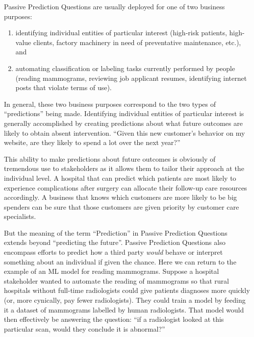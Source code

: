 \documentclass[12pt]{article}
\begin{document}
Passive Prediction Questions are usually deployed for one of two
business purposes:

\begin{enumerate}
\def\labelenumi{\arabic{enumi})}

\item
  identifying individual entities of particular interest (high-risk
  patients, high-value clients, factory machinery in need of
  preventative maintenance, etc.), and
\item
  automating classification or labeling tasks currently performed by
  people (reading mammograms, reviewing job applicant resumes,
  identifying internet posts that violate terms of use).
\end{enumerate}

In general, these two business purposes correspond to the two types of
``predictions'' being made. Identifying individual entities of
particular interest is generally accomplished by creating predictions
about what future outcomes are likely to obtain absent intervention.
``Given this new customer's behavior on my website, are they likely to
spend a lot over the next year?''

This ability to make predictions about future outcomes is obviously of
tremendous use to stakeholders as it allows them to tailor their
approach at the individual level. A hospital that can predict which
patients are most likely to experience complications after surgery can
allocate their follow-up care resources accordingly. A business that
knows which customers are more likely to be big spenders can be sure
that those customers are given priority by customer care specialists.

But the meaning of the term ``Prediction'' in Passive Prediction
Questions extends beyond ``predicting the future''. Passive Prediction
Questions also encompass efforts to predict how a third party
\emph{would} behave or interpret something about an individual if given
the chance. Here we can return to the example of an ML model for reading
mammograms. Suppose a hospital stakeholder wanted to automate the
reading of mammograms so that rural hospitals without full-time
radiologists could give patients diagnoses more quickly (or, more
cynically, pay fewer radiologists). They could train a model by feeding
it a dataset of mammograms labelled by human radiologists. That model
would then effectively be answering the question: ``if a radiologist
looked at this particular scan, would they conclude it is abnormal?''
\end{document}

